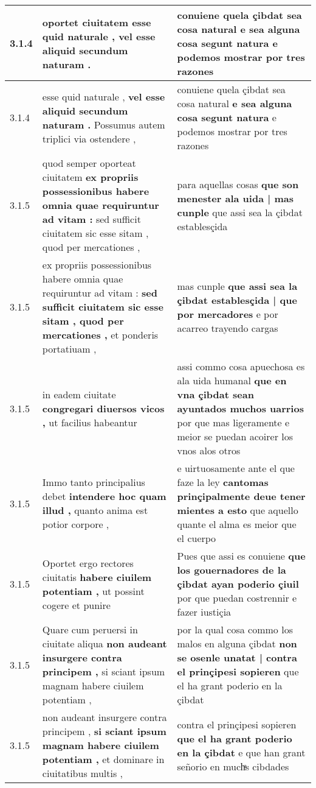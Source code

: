\begin{tabular}{|p{1cm}|p{6.5cm}|p{6.5cm}|}
3.1.4 & oportet ciuitatem \textbf{ esse quid naturale , } vel esse aliquid secundum naturam . & conuiene quela çibdat sea cosa natural \textbf{ e sea alguna cosa segunt natura } e podemos mostrar por tres razones \\\hline
3.1.4 & esse quid naturale , \textbf{ vel esse aliquid secundum naturam . } Possumus autem triplici via ostendere , & conuiene quela çibdat sea cosa natural \textbf{ e sea alguna cosa segunt natura } e podemos mostrar por tres razones \\\hline
3.1.5 & quod semper oporteat ciuitatem \textbf{ ex propriis possessionibus habere omnia quae requiruntur ad vitam : } sed sufficit ciuitatem sic esse sitam , quod per mercationes , & para aquellas cosas \textbf{ que son menester ala uida | mas cunple } que assi sea la çibdat establesçida \\\hline
3.1.5 & ex propriis possessionibus habere omnia quae requiruntur ad vitam : \textbf{ sed sufficit ciuitatem sic esse sitam , quod per mercationes , } et ponderis portatiuam , & mas cunple \textbf{ que assi sea la çibdat establesçida | que por mercadores } e por acarreo trayendo cargas \\\hline
3.1.5 & in eadem ciuitate \textbf{ congregari diuersos vicos , } ut facilius habeantur & assi commo cosa apuechosa es ala uida humanal \textbf{ que en vna çibdat sean ayuntados muchos uarrios } por que mas ligeramente e meior se puedan acoirer los vnos alos otros \\\hline
3.1.5 & Immo tanto principalius debet \textbf{ intendere hoc quam illud , } quanto anima est potior corpore , & e uirtuosamente ante el que faze la ley \textbf{ cantomas prinçipalmente deue tener mientes a esto } que aquello quante el alma es meior que el cuerpo \\\hline
3.1.5 & Oportet ergo rectores ciuitatis \textbf{ habere ciuilem potentiam , } ut possint cogere et punire & Pues que assi es conuiene \textbf{ que los gouernadores de la çibdat ayan poderio çiuil } por que puedan costrennir e fazer iustiçia \\\hline
3.1.5 & Quare cum peruersi in ciuitate aliqua \textbf{ non audeant insurgere contra principem , } si sciant ipsum magnam habere ciuilem potentiam , & por la qual cosa commo los malos en alguna çibdat \textbf{ non se osenle unatat | contra el prinçipesi sopieren } que el ha grant poderio en la çibdat \\\hline
3.1.5 & non audeant insurgere contra principem , \textbf{ si sciant ipsum magnam habere ciuilem potentiam , } et dominare in ciuitatibus multis , & contra el prinçipesi sopieren \textbf{ que el ha grant poderio en la çibdat } e que han grant señorio en muchͣs cibdades \\\hline

\end{tabular}
